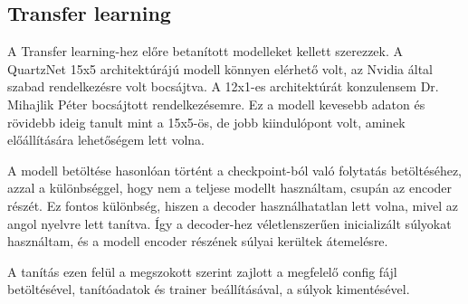 \subsection{Transfer learning}

A Transfer learning-hez előre betanított modelleket kellett szerezzek. A QuartzNet 15x5 architektúrájú modell könnyen elérhető volt, az Nvidia által szabad rendelkezésre volt bocsájtva. A 12x1-es architektúrát konzulensem Dr. Mihajlik Péter bocsájtott rendelkezésemre. Ez a modell kevesebb adaton és rövidebb ideig tanult mint a 15x5-ös, de jobb kiindulópont volt, aminek előállítására lehetőségem lett volna.

A modell betöltése hasonlóan történt a checkpoint-ból való folytatás betöltéséhez, azzal a különbséggel, hogy nem a teljese modellt használtam, csupán az encoder részét. Ez fontos különbség, hiszen a decoder használhatatlan lett volna, mivel az angol nyelvre lett tanítva. Így a decoder-hez véletlenszerűen inicializált súlyokat használtam, és a modell encoder részének súlyai kerültek átemelésre.

A tanítás ezen felül a megszokott szerint zajlott a megfelelő config fájl betöltésével, tanítóadatok és trainer beállításával, a súlyok kimentésével.